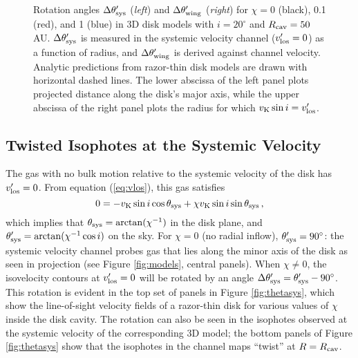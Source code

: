 \begin{figure}[t!]
\caption{Rotation angles $\Delta \theta'_{\rm sys}$ ({\it left}) and $\Delta 
\theta'_{\rm wing}$ ({\it right}) for $\chi = 0$ (black), 0.1 (red), and 1 
(blue) in 3D disk models with $i=20^\circ$ and $R_{\rm cav} = 50$ AU.  $\Delta 
\theta'_{\rm sys}$ is measured in the systemic velocity channel ($v'_{\rm los} 
= 0$) as a function of radius, and $\Delta \theta'_{\rm wing}$ is derived 
against channel velocity.  Analytic predictions from razor-thin disk models are 
drawn with horizontal dashed lines.  The lower abscissa of the left panel plots 
projected distance along the disk's major axis, while the upper abscissa of the 
right panel plots the radius for which $v_{\rm K} \sin i = v'_{\rm los}$.  
\label{fig:vsys}}
\end{figure}

\subsection{Twisted Isophotes at the Systemic Velocity} \label{subsec:isotwist}

The gas with no bulk motion relative to the systemic velocity of the disk has 
$v'_{\rm los} = 0$. From equation (\ref{eq:vlos}), this gas satisfies 
\begin{equation}
0=-v_{\rm K}\sin i\cos\theta_{\rm sys}+\chi v_{\rm K} \sin i\sin\theta_{\rm sys} \,,
\end{equation}
which implies that $\theta_{\rm sys}=\arctan(\chi^{-1})$ in the disk plane, and 
$\theta'_{\rm sys} = \arctan(\chi^{-1} \cos i)$ on the sky.  For $\chi = 0$ (no 
radial inflow), $\theta'_{\rm sys}=90^{\circ}$: the systemic velocity channel 
probes gas that lies along the minor axis of the disk as seen in projection 
(see Figure \ref{fig:models}, central panels).  When $\chi \neq 0$, the 
isovelocity contours at $v'_{\rm los} = 0$ will be rotated by an angle $\Delta 
\theta'_{\rm sys} = \theta'_{\rm sys} - 90^\circ$.  This rotation is evident in 
the top set of panels in Figure \ref{fig:thetasys}, which show the 
line-of-sight velocity fields of a razor-thin disk for various values of $\chi$ 
inside the disk cavity.  The rotation can also be seen in the isophotes 
observed at the systemic velocity of the corresponding 3D model; the bottom 
panels of Figure \ref{fig:thetasys} show that the isophotes in the channel maps 
``twist'' at $R = R_{\rm cav}$.

